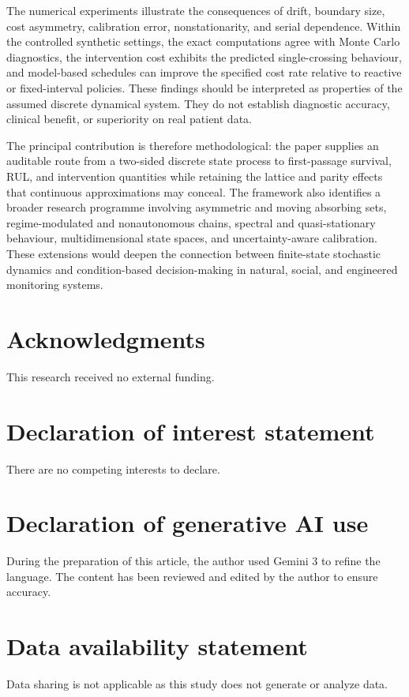 \documentclass[pdflatex,sn-mathphys-num]{sn-jnl}
\theoremstyle{definition}
\numberwithin{equation}{section}
\begin{document}
The numerical experiments illustrate the consequences of drift, boundary
size, cost asymmetry, calibration error, nonstationarity, and serial
dependence. Within the controlled synthetic settings, the exact computations
agree with Monte Carlo diagnostics, the intervention cost exhibits the
predicted single-crossing behaviour, and model-based schedules can improve the
specified cost rate relative to reactive or fixed-interval policies. These
findings should be interpreted as properties of the assumed discrete
dynamical system. They do not establish diagnostic accuracy, clinical benefit,
or superiority on real patient data.

The principal contribution is therefore methodological: the paper supplies an
auditable route from a two-sided discrete state process to first-passage
survival, RUL, and intervention quantities while retaining the lattice and
parity effects that continuous approximations may conceal. The framework also
identifies a broader research programme involving asymmetric and moving
absorbing sets, regime-modulated and nonautonomous chains, spectral and
quasi-stationary behaviour, multidimensional state spaces, and uncertainty-aware
calibration. These extensions would deepen the connection between finite-state
stochastic dynamics and condition-based decision-making in natural, social,
and engineered monitoring systems.


\section*{Acknowledgments}
This research received no external funding.

\section*{Declaration of interest statement}
There are no competing interests to declare.

\section*{Declaration of generative AI use}
During the preparation of this article, the author used Gemini 3 to refine the language. The content has been reviewed and edited by the author to ensure accuracy.

\section*{Data availability statement}
Data sharing is not applicable as this study does not generate or analyze data.
\end{document}
